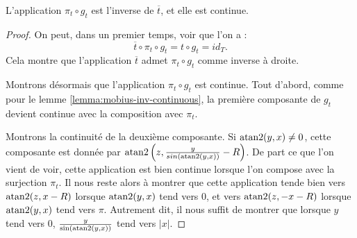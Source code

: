\documentclass[hidelinks, 10pt]{article}
\begin{document}
\begin{lemma}\label{lemma:torus-inv-continuous}
L'application $\pi_t\circ g_t$ est l'inverse de $\overline{t}$, et elle est continue.
\end{lemma}
\begin{proof}
On peut, dans un premier temps, voir que l'on a : \[\overline{t}\circ\pi_t\circ g_t=t\circ g_t=id_T.\]Cela montre que l'application $\overline{t}$ admet $\pi_t\circ g_t$ comme inverse à droite. 

\bigskip Montrons désormais que l'application $\pi_t\circ g_t$ est continue. Tout d'abord, comme pour le lemme \ref{lemma:mobius-inv-continuous}, la première composante de $g_t$ devient continue avec la composition avec $\pi_t$.

Montrons la continuité de la deuxième composante. Si $\mathrm{atan}2(y,x)\neq 0$, cette composante est donnée par $\mathrm{atan}2\left(z,\frac{y}{sin(\mathrm{atan}2(y,x))}-R\right)$. De part ce que l'on vient de voir, cette application est bien continue lorsque l'on compose avec la surjection $\pi_t$. Il nous reste alors à montrer que cette application tende bien vers~$\mathrm{atan}2(z,x-R)$ lorsque $\mathrm{atan}2(y,x)$ tend vers 0, et vers $\mathrm{atan}2(z,-x-R)$ lorsque $\mathrm{atan}2(y,x)$ tend vers $\pi$. Autrement dit, il nous suffit de montrer que lorsque $y$ tend vers 0, $\frac{y}{\sin(\mathrm{atan}2(y,x))}$ tend vers $|x|$.


\end{proof}
\end{document}
